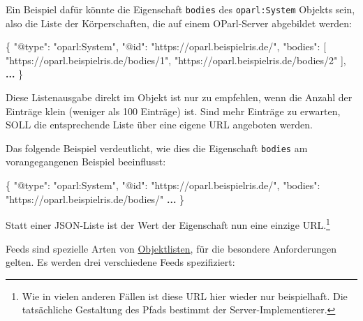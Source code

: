 \documentclass[,a4paper]{article}
\newenvironment{Shaded}{}{}
\newcommand{\DataTypeTok}[1]{\textcolor[rgb]{0.56,0.13,0.00}{{#1}}}
\newcommand{\StringTok}[1]{\textcolor[rgb]{0.25,0.44,0.63}{{#1}}}
\newcommand{\ErrorTok}[1]{\textcolor[rgb]{1.00,0.00,0.00}{\textbf{{#1}}}}
\newcommand{\NormalTok}[1]{{#1}}
\begin{document}
Ein Beispiel dafür könnte die Eigenschaft \texttt{bodies} des
\texttt{oparl:System} Objekts sein, also die Liste der Körperschaften,
die auf einem OParl-Server abgebildet werden:

\begin{Shaded}
\begin{Highlighting}[]
\NormalTok{\{}
    \DataTypeTok{"@type"}\NormalTok{: }\StringTok{"oparl:System"}\NormalTok{,}
    \DataTypeTok{"@id"}\NormalTok{: }\StringTok{"https://oparl.beispielris.de/"}\NormalTok{,}
    \DataTypeTok{"bodies"}\NormalTok{: [}
        \StringTok{"https://oparl.beispielris.de/bodies/1"}\NormalTok{,}
        \StringTok{"https://oparl.beispielris.de/bodies/2"}
    \NormalTok{],}
    \ErrorTok{...}
\NormalTok{\}}
\end{Highlighting}
\end{Shaded}

Diese Listenausgabe direkt im Objekt ist nur zu empfehlen, wenn die
Anzahl der Einträge klein (weniger als 100 Einträge) ist. Sind mehr
Einträge zu erwarten, SOLL die entsprechende Liste über eine eigene URL
angeboten werden.

Das folgende Beispiel verdeutlicht, wie dies die Eigenschaft
\texttt{bodies} am vorangegangenen Beispiel beeinflusst:

\begin{Shaded}
\begin{Highlighting}[]
\NormalTok{\{}
    \DataTypeTok{"@type"}\NormalTok{: }\StringTok{"oparl:System"}\NormalTok{,}
    \DataTypeTok{"@id"}\NormalTok{: }\StringTok{"https://oparl.beispielris.de/"}\NormalTok{,}
    \DataTypeTok{"bodies"}\NormalTok{: }\StringTok{"https://oparl.beispielris.de/bodies/"}
    \ErrorTok{...}
\NormalTok{\}}
\end{Highlighting}
\end{Shaded}

Statt einer JSON-Liste ist der Wert der Eigenschaft nun eine einzige
URL.\footnote{Wie in vielen anderen Fällen ist diese URL hier wieder nur
  beispielhaft. Die tatsächliche Gestaltung des Pfads bestimmt der
  Server-Implementierer.}


Feeds sind spezielle Arten von \hyperref[objektlisten]{Objektlisten},
für die besondere Anforderungen gelten. Es werden drei verschiedene
Feeds spezifiziert:
\end{document}
